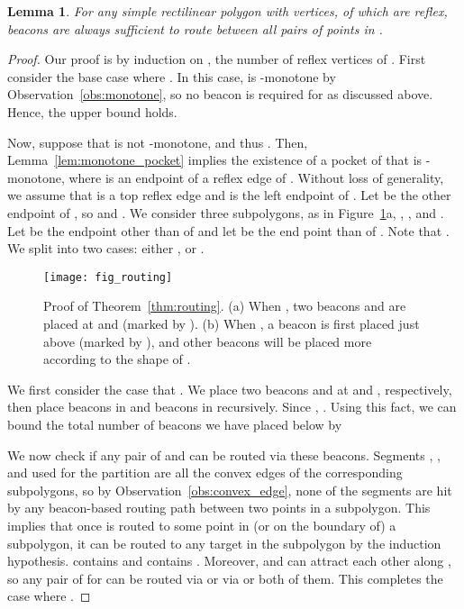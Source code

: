\documentclass[11pt]{article}
\newtheorem{lemma}{Lemma}
\theoremstyle{definition}
\begin{document}
\begin{lemma}
\label{lem:routing}
 For any simple rectilinear polygon  with  vertices,  of which are reflex,
  beacons are always sufficient
 to route between all pairs of points in . 
\end{lemma}
\begin{proof}
Our proof is by induction on , the number of reflex vertices of .
First consider the base case where .
In this case,  is -monotone by Observation~\ref{obs:monotone},
so no beacon is required for  as discussed above.
Hence, the upper bound holds.

Now, suppose that  is not -monotone, and thus .
Then, Lemma~\ref{lem:monotone_pocket} implies the existence of
a pocket  of  that is -monotone, where  is an endpoint of a reflex edge  of .
Without loss of generality, we assume that  is a top reflex edge and  is the left endpoint of .
Let  be the other endpoint of , so
 and .
We consider three subpolygons, as in Figure~\ref{fig:routing}a,
, , and . Let  be the endpoint other than  of  and let  be the end point than  of . Note that .
We split into two cases: either , or .

\begin{figure}[tb]
\centering
\texttt{[image: fig\_routing]}
\caption{Proof of Theorem~\ref{thm:routing}. (a) When ,
two beacons  and  are placed at  and  (marked by ).
(b) When , a beacon  is first placed just above  (marked by ), and other beacons will be placed more according to the shape of .}
\label{fig:routing}
\end{figure}

We first consider the case that . We place two beacons  and  at  and , respectively, then place  beacons in  and  beacons in  recursively. Since , . Using this fact, we can bound the total number of beacons we have placed below by


We now check if any pair of  and  can be routed via these beacons. 
Segments , , and  used for the partition are all the convex edges of the corresponding subpolygons, so by Observation~\ref{obs:convex_edge}, none of the segments are hit by any beacon-based routing path between two points in a subpolygon. This implies that once  is routed to some point in (or on the boundary of) a subpolygon, it can be routed to any target  in the subpolygon by the induction hypothesis.  contains  and  contains . Moreover,  and  can attract each other along , so any pair of  for  can be routed via  or via  or both of them. This completes the case where .


\end{proof}
\end{document}
